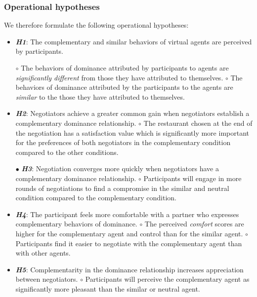 \documentclass{llncs}
\begin{document}
\subsubsection{Operational hypotheses}
We therefore formulate the following operational hypotheses:
\begin{itemize}
	\item \textit{\textbf{H1}}: The complementary and similar behaviors of virtual agents are perceived by participants.
	
	\subitem $\circ$ The behaviors of dominance attributed by participants to agents are \textit{significantly different} from those they have attributed to themselves.
	\subitem $\circ$ The behaviors of dominance attributed by the participants to the agents are \textit{similar} to the those they have attributed to themselves.
	
	\item \textit{ \textbf{H2}}: Negotiators achieve a greater common gain when negotiators establish a complementary dominance relationship.
	\subitem $\circ$ The restaurant chosen at the end of the negotiation has a satisfaction value which is significantly more important for the preferences of both negotiators in the complementary condition compared to the other conditions. 
	
	\item[$\bullet$] \textit{\textbf{H3}}: Negotiation converges more quickly when negotiators have a complementary dominance relationship.
	\subitem $\circ$ Participants will engage in more rounds of negotiations to find a compromise in the similar and neutral condition compared to the complementary condition.
	
	\item \textit{\textbf{H4}}: The participant feels more comfortable with a partner who expresses complementary behaviors of dominance.
	\subitem $\circ$ The perceived \emph{comfort} scores are higher for the complementary agent and control than for the similar agent.
	\subitem $\circ$ Participants find it easier to negotiate with the complementary agent than with other agents.
	
	\item \textit{\textbf{H5}}: Complementarity in the dominance relationship increases appreciation between negotiators.
	\subitem $\circ$ Participants will perceive the complementary agent as significantly more pleasant than the similar or neutral agent.
	
\end{itemize}
\end{document}
